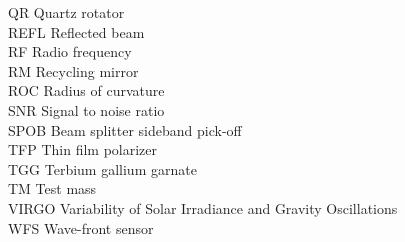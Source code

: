 \begin{tabbing}
QR \> Quartz rotator \\
REFL \> Reflected beam \\
RF \> Radio frequency \\
RM \> Recycling mirror \\
ROC \> Radius of curvature \\
SNR \> Signal to noise ratio \\
SPOB \> Beam splitter sideband pick-off \\
TFP \> Thin film polarizer \\
TGG \> Terbium gallium garnate \\
TM \> Test mass \\
VIRGO \> Variability of Solar Irradiance and Gravity Oscillations \\
WFS \> Wave-front sensor 
\end{tabbing}
